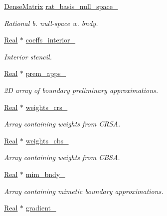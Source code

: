 \begin{DoxyCompactItemize}
\hyperlink{classmtk_1_1DenseMatrix}{Dense\+Matrix} \hyperlink{classmtk_1_1Grad1D_a21a2941a03ae8fbf24d880660acf3db5}{rat\+\_\+basis\+\_\+null\+\_\+space\+\_\+}
\begin{DoxyCompactList}\small\item\em Rational b. null-\/space w. bndy. \end{DoxyCompactList}\item 
\hyperlink{group__c01-roots_gac080bbbf5cbb5502c9f00405f894857d}{Real} $\ast$ \hyperlink{classmtk_1_1Grad1D_a2395861161c26f237e892aacebcc1909}{coeffs\+\_\+interior\+\_\+}
\begin{DoxyCompactList}\small\item\em Interior stencil. \end{DoxyCompactList}\item 
\hyperlink{group__c01-roots_gac080bbbf5cbb5502c9f00405f894857d}{Real} $\ast$ \hyperlink{classmtk_1_1Grad1D_aee092221dd2a496e0d51883168035551}{prem\+\_\+apps\+\_\+}
\begin{DoxyCompactList}\small\item\em 2\+D array of boundary preliminary approximations. \end{DoxyCompactList}\item 
\hyperlink{group__c01-roots_gac080bbbf5cbb5502c9f00405f894857d}{Real} $\ast$ \hyperlink{classmtk_1_1Grad1D_a96914abea78528b32499963ce9bbe4a6}{weights\+\_\+crs\+\_\+}
\begin{DoxyCompactList}\small\item\em Array containing weights from C\+R\+S\+A. \end{DoxyCompactList}\item 
\hyperlink{group__c01-roots_gac080bbbf5cbb5502c9f00405f894857d}{Real} $\ast$ \hyperlink{classmtk_1_1Grad1D_ae6b0a908748923b2acd97e5bf7acc000}{weights\+\_\+cbs\+\_\+}
\begin{DoxyCompactList}\small\item\em Array containing weights from C\+B\+S\+A. \end{DoxyCompactList}\item 
\hyperlink{group__c01-roots_gac080bbbf5cbb5502c9f00405f894857d}{Real} $\ast$ \hyperlink{classmtk_1_1Grad1D_afcd61d362ba7b0f588645ab09c773432}{mim\+\_\+bndy\+\_\+}
\begin{DoxyCompactList}\small\item\em Array containing mimetic boundary approximations. \end{DoxyCompactList}\item 
\hyperlink{group__c01-roots_gac080bbbf5cbb5502c9f00405f894857d}{Real} $\ast$ \hyperlink{classmtk_1_1Grad1D_a024b84b1ea285c0c590eb42d40ff4469}{gradient\+\_\+}

\end{DoxyCompactItemize}
